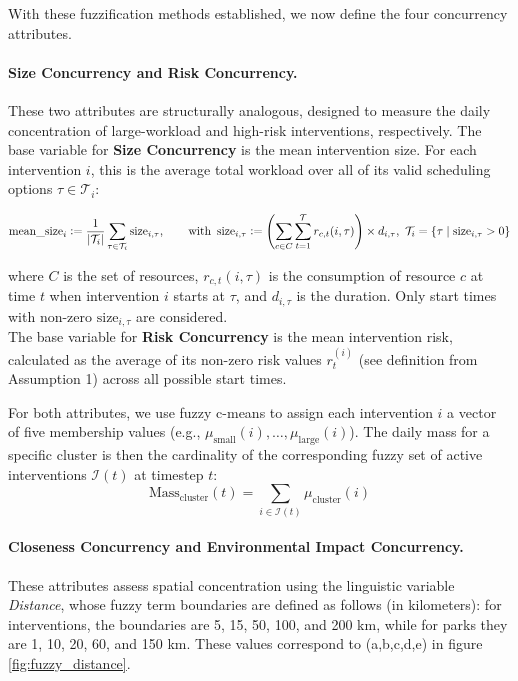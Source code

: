 With these fuzzification methods established, we now define the four concurrency attributes.

\paragraph{Size Concurrency and Risk Concurrency.}
These two attributes are structurally analogous, designed to measure the daily concentration of large-workload and high-risk interventions, respectively. The base variable for \textbf{Size Concurrency} is the mean intervention size. For each intervention $i$, this is the average total workload over all of its valid scheduling options $\tau \in \mathcal{T}_i$:

\[
    \text{mean\_size}_i \mathrel{\mathop:}= \frac{1}{|\mathcal{T}_i|} \sum_{\tau\in \mathcal{T}_i} \text{size}_{i,\tau},
    \qquad \text{with }\,
    \text{size}_{i,\tau} \mathrel{\mathop:}= \left(\sum_{c \in C} \sum_{t=1}^{\mathcal{T}} r_{c,t}(i,\tau)\right) \times d_{i,\tau}, \,\, \mathcal{T}_i = \{ \tau \mid \text{size}_{i,\tau} > 0 \}
\]

where \(C\) is the set of resources, \(r_{c,t}(i,\tau)\) is the consumption of resource \(c\) at time \(t\) when intervention \(i\) starts at \(\tau\), and \(d_{i,\tau}\) is the duration. Only start times with non-zero \(\text{size}_{i,\tau}\) are considered. \\
The base variable for \textbf{Risk Concurrency} is the mean intervention risk, calculated as the average of its non-zero risk values $r_t^{(i)}$ (see definition from Assumption 1) across all possible start times. 

For both attributes, we use fuzzy c-means to assign each intervention $i$ a vector of five membership values (e.g., $\mu_{\text{small}}(i), \dots, \mu_{\text{large}}(i)$). The daily mass for a specific cluster is then the cardinality of the corresponding fuzzy set of active interventions $\mathcal{I}(t)$ at timestep $t$:
\[
    \text{Mass}_{\text{cluster}}(t) = \sum_{i \in \mathcal{I}(t)} \mu_{\text{cluster}}(i)
\]


    
    


\paragraph{Closeness Concurrency and Environmental Impact Concurrency.}
These attributes assess spatial concentration using the linguistic variable \textit{Distance}, whose fuzzy term boundaries are defined as follows (in kilometers): for interventions, the boundaries are 5, 15, 50, 100, and 200 km, while for parks they are 1, 10, 20, 60, and 150 km. These values correspond to (a,b,c,d,e) in figure \ref{fig:fuzzy_distance}.

